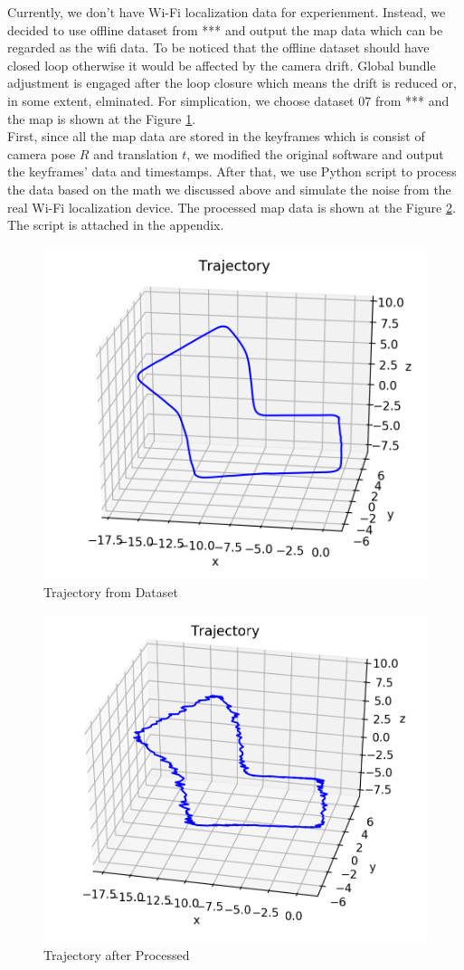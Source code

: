 Currently, we don't have Wi-Fi localization data for experienment. Instead, we decided to use offline dataset from *** and output the map data which can be regarded as the wifi data. To be noticed that the offline dataset should have closed loop otherwise it would be affected by the camera drift. Global bundle adjustment is engaged after the loop closure which means the drift is reduced or, in some extent, elminated. For simplication, we choose dataset 07 from *** and the map is shown at the Figure \ref{Track_original}.\\
First, since all the map data are stored in the keyframes which is consist of camera pose $R$ and translation $t$, we modified the original software and output the keyframes' data and timestamps. After that, we use Python script to process the data based on the math we discussed above and simulate the noise from the real Wi-Fi localization device. The processed map data is shown at the Figure \ref{Track_processed}. The script is attached in the appendix.
\begin{figure}
    \centering
    \includegraphics[scale=0.72]{Trajectory.png}
    \caption{Trajectory from Dataset}
    \label{Track_original}
\end{figure}
\begin{figure}
    \centering
    \includegraphics[scale=0.69]{Trajectory_1.png}
    \caption{Trajectory after Processed}
    \label{Track_processed}
\end{figure}